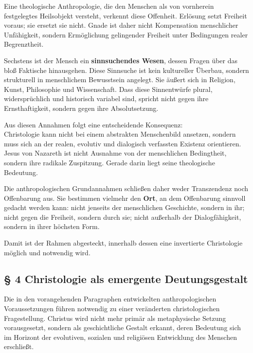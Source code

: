\documentclass[
]{article}
\begin{document}
Eine theologische Anthropologie, die den Menschen als von vornherein festgelegtes Heilsobjekt versteht, verkennt diese Offenheit. Erlösung setzt Freiheit voraus; sie ersetzt sie nicht. Gnade ist daher nicht Kompensation menschlicher Unfähigkeit, sondern Ermöglichung gelingender Freiheit unter Bedingungen realer Begrenztheit.

Sechstens ist der Mensch ein \textbf{sinnsuchendes Wesen}, dessen Fragen über das bloß Faktische hinausgehen. Diese Sinnsuche ist kein kultureller Überbau, sondern strukturell in menschlichem Bewusstsein angelegt. Sie äußert sich in Religion, Kunst, Philosophie und Wissenschaft. Dass diese Sinnentwürfe plural, widersprüchlich und historisch variabel sind, spricht nicht gegen ihre Ernsthaftigkeit, sondern gegen ihre Absolutsetzung.

Aus diesen Annahmen folgt eine entscheidende Konsequenz:\\
Christologie kann nicht bei einem abstrakten Menschenbild ansetzen, sondern muss sich an der realen, evolutiv und dialogisch verfassten Existenz orientieren. Jesus von Nazareth ist nicht Ausnahme von der menschlichen Bedingtheit, sondern ihre radikale Zuspitzung. Gerade darin liegt seine theologische Bedeutung.

Die anthropologischen Grundannahmen schließen daher weder Transzendenz noch Offenbarung aus. Sie bestimmen vielmehr den \textbf{Ort}, an dem Offenbarung sinnvoll gedacht werden kann: nicht jenseits der menschlichen Geschichte, sondern in ihr; nicht gegen die Freiheit, sondern durch sie; nicht außerhalb der Dialogfähigkeit, sondern in ihrer höchsten Form.

Damit ist der Rahmen abgesteckt, innerhalb dessen eine invertierte Christologie möglich und notwendig wird.

\subsection{\texorpdfstring{\textbf{§ 4 Christologie als emergente Deutungsgestalt}}{§ 4 Christologie als emergente Deutungsgestalt}}\label{christologie-als-emergente-deutungsgestalt}

Die in den vorangehenden Paragraphen entwickelten anthropologischen Voraussetzungen führen notwendig zu einer veränderten christologischen Fragestellung. Christus wird nicht mehr primär als metaphysische Setzung vorausgesetzt, sondern als geschichtliche Gestalt erkannt, deren Bedeutung sich im Horizont der evolutiven, sozialen und religiösen Entwicklung des Menschen erschließt.
\end{document}
